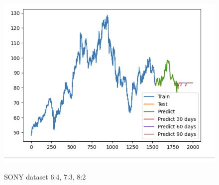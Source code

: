 \documentclass[conference]{IEEEtran}
\begin{document}
\begin{figure}[H]
\begin{minipage}{0.15\textwidth}
    \label{fig:2}
    \end{minipage}%
    \begin{minipage}{0.15\textwidth}
    \centering
    \includegraphics[width=1\textwidth]{Image/Light GBM/LightGBM_SONY_8_2.png}

    \label{fig:3}
    \end{minipage}
    \caption{SONY dataset  6:4, 7:3, 8:2 }
\end{figure}
\end{document}
